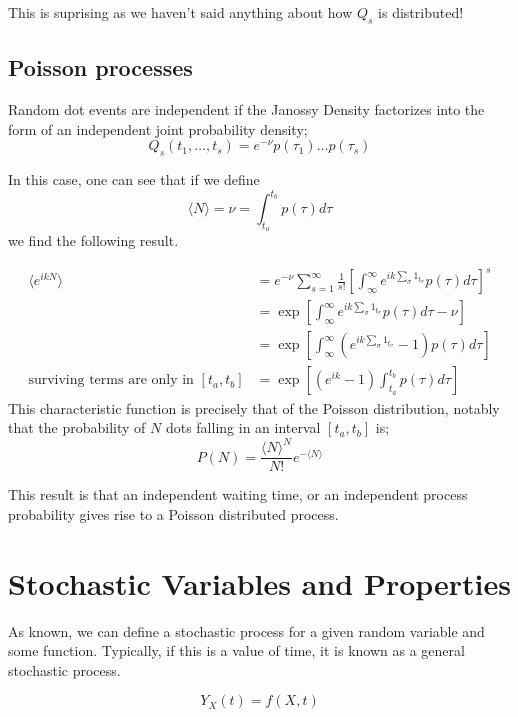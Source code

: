  This is suprising as we haven't said anything about how $Q_s$ is distributed!
 
 \subsection{Poisson processes}
 Random dot events are independent if the Janossy Density factorizes into the form of an independent joint probability density;
 \begin{equation}
 	Q_s(t_1, \dots, t_s) = e^{-\nu}p(\tau_1) \dots p(\tau_s)
 \end{equation}
 
 In this case, one can see that if we define \[\langle N \rangle = \nu =  \int_{t_a}^{t_b}p(\tau)d\tau\] we find the following result.
 
 \begin{align*}
 	\langle e^{ikN} \rangle &= e^{-\nu}\sum_{s=1}^\infty \frac{1}{s!}\left[\int_{\infty}^{\infty}e^{ik\sum_{\sigma} 1_{t_\sigma}}p(\tau)d\tau\right]^s \\
 	&= \exp \left[\int_{\infty}^{\infty}e^{ik\sum_{\sigma} 1_{t_\sigma}}p(\tau)d\tau - \nu \right]\\
 	&= \exp \left[\int_{\infty}^{\infty}\left(e^{ik\sum_{\sigma} 1_{t_\sigma}} - 1 \right)p(\tau)d\tau \right]\\
	\text{surviving terms are only in }[t_a, t_b]&= \exp \left[\left(e^{ik} - 1 \right)\int_{t_a}^{t_b}p(\tau)d\tau \right]
 \end{align*}
 This characteristic function is precisely that of the Poisson distribution, notably that the probability of $N$ dots falling in an interval $[t_a, t_b]$ is;
 \begin{equation}
 	P(N) = \frac{\langle N \rangle^N}{N!}e^{-\langle N \rangle}
 \end{equation}
 
 This result is that an independent waiting time, or an independent process probability gives rise to a Poisson distributed process. 
 
 \section{Stochastic Variables and Properties}
 As known, we can define a stochastic process for a given random variable and some function. Typically, if this is a value of time, it is known as a general stochastic process.
 
 \begin{equation}
 	Y_X(t) = f(X, t)
 \end{equation}
 
